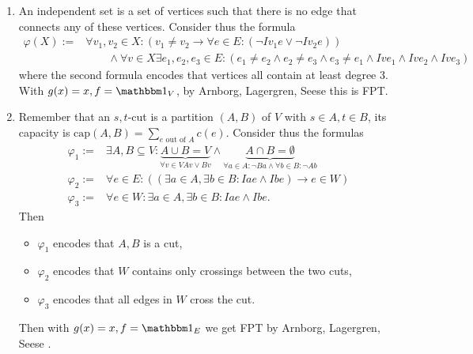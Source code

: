 \documentclass{article}
\begin{document}
\begin{solving}
\begin{enumerate}
        \item An independent set is a set of vertices such that there is no edge that connects any of these vertices. Consider thus the formula \begin{align*}
            \varphi(X) :=& \forall v_1,v_2\in X: \left(v_1\neq v_2\to \forall e\in E: \left(\lnot Iv_1e\lor \lnot Iv_2e\right)\right)\\
            &\qquad \land\forall v\in X \exists e_1, e_2, e_3 \in E: \left(e_1\neq e_2\land e_2\neq e_3\land e_3\neq e_1 \land Ive_1 \land Ive_2\land Ive_3 \right)
        \end{align*}
        where the second formula encodes that vertices all contain at least degree 3. With $g(x)= x, f = \mathbbm 1_V$, by  Arnborg, Lagergren, Seese this is FPT.
        \item Remember that an $s,t$-cut is a partition $(A, B)$ of $V$ with $s\in A, t\in B$, its capacity is $\mathrm{cap}(A,B) = \sum_{e\text{ out of }A} c(e)$. Consider thus the formulas \begin{align*}
            \varphi_1 := & \exists A,B\subseteq V: \underbrace{A\cup B = V}_{\forall v\in V Av\lor Bv}\land \underbrace{A\cap B = \emptyset}_{\forall a\in A: \lnot Ba\land \forall b\in B: \lnot Ab} \\
            \varphi_2 := & \forall e\in E: \left(\left(\exists a \in A, \exists b\in B: Iae\land Ibe\right)\to e\in W\right)\\
            \varphi_3:= & \forall e\in W: \exists a\in A,\exists b\in B: Iae\land Ibe.
        \end{align*}
        Then \begin{itemize}
            \item $\varphi_1$ encodes that $A, B$ is a cut,
            \item $\varphi_2$ encodes that $W$ contains only crossings between the two cuts,
            \item $\varphi_3$ encodes that all edges in $W$ cross the cut.
        \end{itemize}
        Then with $g(x) = x, f=\mathbbm1_{E}$ we get FPT by  Arnborg, Lagergren, Seese .
    \end{enumerate}
\end{solving}
\newpage
\end{document}
